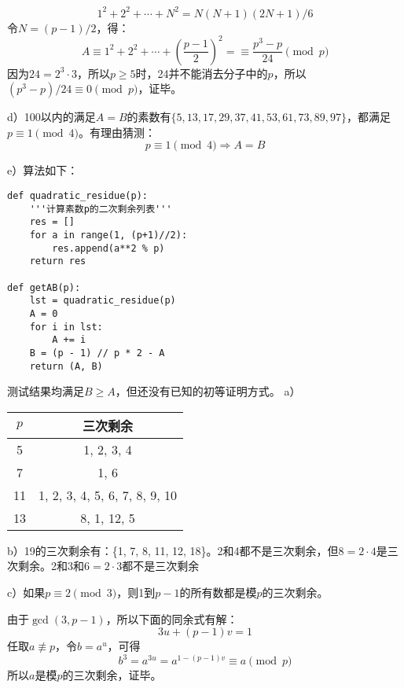 \[1^2+2^2+\cdots + N^2=N(N+1)(2N+1)/6\]
令$N=(p-1)/2$，得：
\[A\equiv 1^2+2^2+\cdots + \left(\frac{p-1}{2}\right)^2=\equiv\frac{p^3-p}{24}\pmod p\]
因为$24=2^3\cdot3$，所以$p\ge5$时，24并不能消去分子中的$p$，所以$(p^3-p)/24\equiv 0\pmod p$，证毕。\par
d）100以内的满足$A=B$的素数有$\{5,13,17,29,37,41,53,61,73,89,97\}$，都满足$p\equiv1\pmod4$。有理由猜测：
\[p\equiv1\pmod4 \Longrightarrow A=B\]\par
e）算法如下：
\begin{lstlisting}
def quadratic_residue(p):
    '''计算素数p的二次剩余列表'''
    res = []
    for a in range(1, (p+1)//2):
        res.append(a**2 % p)
    return res

def getAB(p):
    lst = quadratic_residue(p)
    A = 0
    for i in lst:
        A += i
    B = (p - 1) // p * 2 - A
    return (A, B)
\end{lstlisting}
测试结果均满足$B\ge A$，但还没有已知的初等证明方式。
%
\exercise a）
\begin{center}
\begin{tabular}{c|c}
$p$ & 三次剩余 \\
\hline
5 & {1, 2, 3, 4} \\
7 & {1, 6} \\
11 & {1, 2, 3, 4, 5, 6, 7, 8, 9, 10} \\
13 & {8, 1, 12, 5} \\
\end{tabular}
\end{center}\par
b）19的三次剩余有：\{1, 7, 8, 11, 12, 18\}。2和4都不是三次剩余，但$8=2\cdot4$是三次剩余。2和3和$6=2\cdot3$都不是三次剩余\par
c）如果$p\equiv2\pmod3$，则1到$p-1$的所有数都是模$p$的三次剩余。\par
\proof 由于$\gcd(3, p-1)$，所以下面的同余式有解：
\[3u+(p-1)v=1\]
任取$a\not\equiv p$，令$b=a^u$，可得
\[b^3=a^{3u}=a^{1-(p-1)v}\equiv a\pmod p\]
所以$a$是模$p$的三次剩余，证毕。